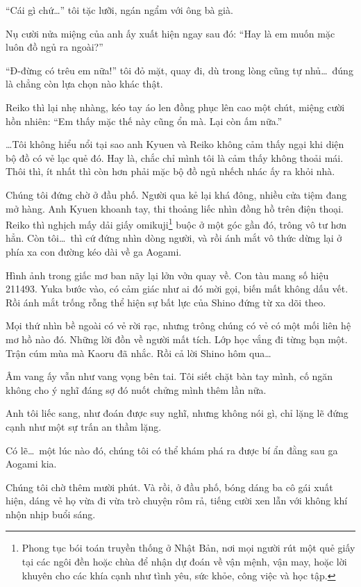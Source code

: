 \documentclass[../main.tex]{subfiles}
\begin{document}
``Cái gì chứ\dots'' tôi tặc lưỡi, ngán ngẩm với ông bà già.

Nụ cười nửa miệng của anh ấy xuất hiện ngay sau đó: ``Hay là em muốn mặc luôn đồ ngủ ra ngoài?''

``Đ-đừng có trêu em nữa!'' tôi đỏ mặt, quay đi, dù trong lòng cũng tự nhủ\dots\ đúng là chẳng còn lựa chọn nào khác thật.

Reiko thì lại nhẹ nhàng, kéo tay áo len đồng phục lên cao một chút, miệng cười hồn nhiên: ``Em thấy mặc thế này cũng ổn mà. Lại còn ấm nữa.''

\dots Tôi không hiểu nổi tại sao anh Kyuen và Reiko không cảm thấy ngại khi diện bộ đồ có vẻ lạc quẻ đó. Hay là, chắc chỉ mình tôi là cảm thấy không thoải mái. Thôi thì, ít nhất thì còn hơn phải mặc bộ đồ ngủ nhếch nhác ấy ra khỏi nhà.

Chúng tôi đứng chờ ở đầu phố. Người qua kẻ lại khá đông, nhiều cửa tiệm đang mở hàng. Anh Kyuen khoanh tay, thi thoảng liếc nhìn đồng hồ trên điện thoại. Reiko thì nghịch mấy dải giấy omikuji\footnote{Phong tục bói toán truyền thống ở Nhật Bản, nơi mọi người rút một quẻ giấy tại các ngôi đền hoặc chùa để nhận dự đoán về vận mệnh, vận may, hoặc lời khuyên cho các khía cạnh như tình yêu, sức khỏe, công việc và học tập.} buộc ở một góc gần đó, trông vô tư hơn hẳn. Còn tôi\dots\ thì cứ đứng nhìn dòng người, và rồi ánh mắt vô thức dừng lại ở phía xa con đường kéo dài về ga Aogami.

Hình ảnh trong giấc mơ ban nãy lại lởn vởn quay về. Con tàu mang số hiệu 211493. Yuka bước vào, có cảm giác như ai đó mời gọi, biến mất không dấu vết. Rồi ánh mắt trống rỗng thể hiện sự bất lực của Shino đứng từ xa dõi theo.

Mọi thứ nhìn bề ngoài có vẻ rời rạc, nhưng trông chúng có vẻ có một mối liên hệ mơ hồ nào đó. Những lời đồn về người mất tích. Lớp học vắng đi từng bạn một. Trận cúm mùa mà Kaoru đã nhắc. Rồi cả lời Shino hôm qua\dots

Âm vang ấy vẫn như vang vọng bên tai. Tôi siết chặt bàn tay mình, cố ngăn không cho ý nghĩ đáng sợ đó nuốt chửng mình thêm lần nữa.

Anh tôi liếc sang, như đoán được suy nghĩ, nhưng không nói gì, chỉ lặng lẽ đứng cạnh như một sự trấn an thầm lặng.

Có lẽ\dots\ một lúc nào đó, chúng tôi có thể khám phá ra được bí ẩn đằng sau ga Aogami kia.

\ct

Chúng tôi chờ thêm mười phút. Và rồi, ở đầu phố, bóng dáng ba cô gái xuất hiện, dáng vẻ họ vừa đi vừa trò chuyện rôm rả, tiếng cười xen lẫn với không khí nhộn nhịp buổi sáng.
\end{document}
